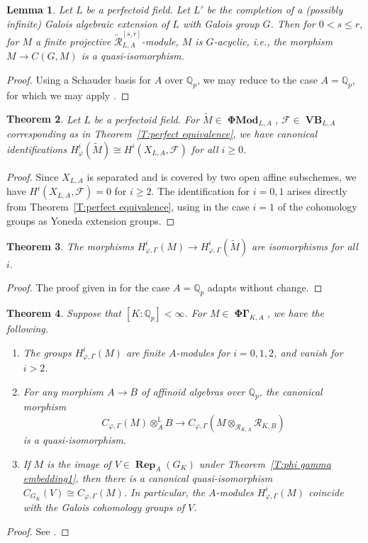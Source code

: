 \documentclass[12pt]{amsart}
\newtheorem{theorem}{Theorem}[section]
\newtheorem{lemma}[theorem]{Lemma}
\theoremstyle{definition}
\numberwithin{equation}{theorem}
\newcommand{\QQ}{\mathbb{Q}}
\newcommand{\calF}{\mathcal{F}}
\newcommand{\calR}{\mathcal{R}}
\DeclareMathOperator{\PhiGamma}{\mathbf{\Phi \Gamma}}
\DeclareMathOperator{\PhiMod}{\mathbf{\Phi Mod}}
\DeclareMathOperator{\Rep}{\mathbf{Rep}}
\DeclareMathOperator{\VB}{\mathbf{VB}}
\begin{document}
\begin{lemma} \label{L:perfect descend cohomology}
Let $L$ be a perfectoid field.
Let $L'$ be the completion of a (possibly infinite) Galois algebraic extension of $L$ with Galois group $G$. Then for $0 < s \leq r$, for $M$ a finite projective $\tilde{\calR}^{[s,r]}_{L,A}$-module, $M$ is $G$-acyclic, i.e.,
the morphism $M \to C(G,M)$ is a quasi-isomorphism.
\end{lemma}
\begin{proof}
Using a Schauder basis for $A$ over $\QQ_p$, we may reduce to the case $A = \QQ_p$,
for which we may apply \cite[Theorem~8.2.22]{kedlaya-liu1}.
\end{proof}

\begin{theorem}
Let $L$ be a perfectoid field.
For $\tilde{M} \in \PhiMod_{L,A}$, $\calF \in \VB_{L,A}$ corresponding as in
Theorem~\ref{T:perfect equivalence}, we have canonical identifications
$H^i_{\varphi}(\tilde{M}) \cong H^i(X_{L,A}, \calF)$ for all $i \geq 0$.
\end{theorem}
\begin{proof}
Since $X_{L,A}$ is separated and is covered by two open affine subschemes, we have 
$H^i(X_{L,A}, \calF) = 0$ for $i \geq 2$. The identification for $i=0,1$ arises directly
from Theorem~\ref{T:perfect equivalence}, using in the case $i=1$ of the cohomology groups as Yoneda extension groups.
\end{proof}


\begin{theorem} \label{T:compare phi Gamma cohomology}
The morphisms $H^i_{\varphi, \Gamma}(M) \to H^i_{\varphi, \Gamma}(\tilde{M})$ are isomorphisms for all $i$.
\end{theorem}
\begin{proof}
The proof given in \cite{kedlaya-liu2} for the case $A = \QQ_p$ adapts without change.
\end{proof}

\begin{theorem} \label{T:coherence cohomology}
Suppose that $[K:\QQ_p] < \infty$.
For $M \in \PhiGamma_{K,A}$, we have the following.
\begin{enumerate}
\item[(a)] The groups $H^i_{\varphi, \Gamma}(M)$ are finite $A$-modules for $i=0,1,2$, and vanish for $i>2$.
\item[(b)] For any morphism $A \to B$ of affinoid algebras over $\QQ_p$, the canonical morphism
\[
C_{\varphi, \Gamma}(M) \otimes^{\mathbb{L}}_A B
\to C_{\varphi, \Gamma}(M \otimes_{\calR_{K,A}} \calR_{K,B})
\]
is a quasi-isomorphism.
\item[(c)]
If $M$ is the image of $V \in \Rep_A(G_K)$ under Theorem~\ref{T:phi gamma embedding1},
then there is a canonical quasi-isomorphism $C_{G_K}(V) \cong C_{\varphi, \Gamma}(M)$.
In particular, the $A$-modules $H^i_{\varphi, \Gamma}(M)$ coincide with the Galois cohomology groups of $V$.
\end{enumerate}
\end{theorem}
\begin{proof}
See \cite[Proposition~2.3.7, Theorem~4.4.2, Theorem~4.4.3]{kpx}.
\end{proof}
\end{document}
